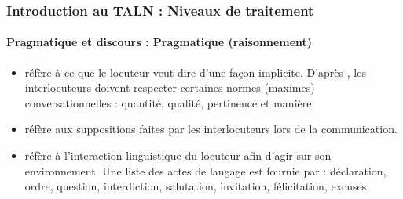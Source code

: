 \documentclass[xcolor=table]{beamer}
\begin{document}
\begin{frame}
\frametitle{Introduction au TALN : Niveaux de traitement}
\framesubtitle{Pragmatique et discours : Pragmatique (raisonnement)}


\begin{itemize}
	\item {} réfère à ce que le locuteur veut dire d'une façon implicite.
	D'après \cite{1979-Grice}, les interlocuteurs doivent respecter certaines normes (maximes) conversationnelles  : quantité, qualité, pertinence et manière. 
	
	\item {} réfère aux suppositions faites par les interlocuteurs lors de la communication.
	
	\item {} réfère à l'interaction linguistique du locuteur afin d'agir sur son environnement. Une liste des actes de langage est fournie par \cite{1962-austin} : déclaration, ordre, question, interdiction, salutation, invitation, félicitation, excuses.
\end{itemize}

\end{frame}
\end{document}
